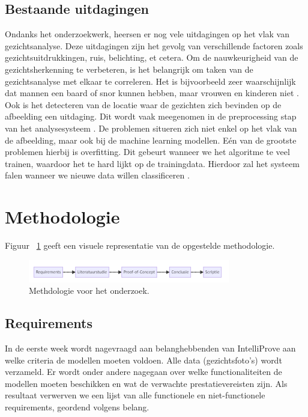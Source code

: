 \subsection{Bestaande uitdagingen}
Ondanks het onderzoekwerk, heersen er nog vele uitdagingen op het vlak van gezichtsanalyse. Deze uitdagingen zijn het gevolg van verschillende factoren zoals gezichtsuitdrukkingen, ruis, belichting, et cetera. Om de nauwkeurigheid van de gezichtsherkenning te verbeteren, is het belangrijk om taken van de gezichtsanalyse met elkaar te correleren. Het is bijvoorbeeld zeer waarschijnlijk dat mannen een baard of snor kunnen hebben, maar vrouwen en kinderen niet \autocite{Siddiqi2022}. Ook is het detecteren van de locatie waar de gezichten zich bevinden op de afbeelding een uitdaging. Dit wordt vaak meegenomen in de preprocessing stap van het analysesysteem \autocite{Jiang2008}.
De problemen situeren zich niet enkel op het vlak van de afbeelding, maar ook bij de machine learning modellen. Eén van de grootste problemen hierbij is overfitting. Dit gebeurt wanneer we het algoritme te veel trainen, waardoor het te hard lijkt op de trainingdata. Hierdoor zal het systeem falen wanneer we nieuwe data willen classificeren \autocite{Coppens2018}.



\section{Methodologie}%
\label{sec:vmethodologie}
Figuur {~\ref{fig:vmethodologie}} geeft een visuele representatie van de opgestelde methodologie.
\begin{figure}
    \centering
    \includegraphics[width=\columnwidth]{graphics/flowchart.PNG}
    \caption[Methodologie]{\label{fig:vmethodologie}Methdologie voor het onderzoek.}
\end{figure}

\subsection{Requirements}
\label{sub:vrequirements}
In de eerste week wordt nagevraagd aan belanghebbenden van IntelliProve aan welke criteria de modellen moeten voldoen. Alle data (gezichtsfoto's) wordt verzameld. Er wordt onder andere nagegaan over welke functionaliteiten de modellen moeten beschikken en wat de verwachte prestatievereisten zijn. 
Als resultaat verwerven we een lijst van alle functionele en niet-functionele requirements, geordend volgens belang. 


